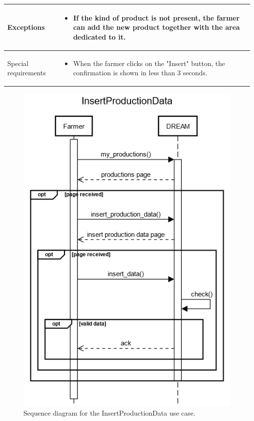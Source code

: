 \documentclass{article}
\begin{document}
\begin{longtable}{|p{3.5cm}|m{8cm}|}
 \hline
 Exceptions & \begin{itemize}
     \item If the kind of product is not present, the farmer can add the new product together with the area dedicated to it.
 \end{itemize}\\
 \hline
 Special requirements & \begin{itemize}
     \item When the farmer clicks on the "Insert" button, the confirmation is shown in less than 3 seconds.
 \end{itemize}\\
 \hline
\end{longtable}

\begin{figure}[H]
    \centering
    \includegraphics[scale=0.75]{sequence_diagrams/InsertProductionData.png}
    \caption{Sequence diagram for the InsertProductionData use case.}
\end{figure}
\newpage
\end{document}
